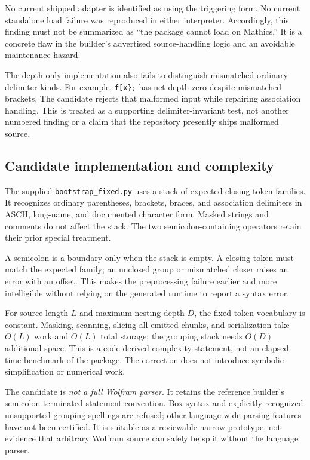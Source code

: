 \documentclass[11pt,letterpaper]{article}
\newcommand{\code}[1]{\nolinkurl{#1}}
\begin{document}
No current shipped adapter is identified as using the triggering form. No current standalone load failure was reproduced in either interpreter. Accordingly, this finding must not be summarized as ``the package cannot load on Mathics.'' It is a concrete flaw in the builder's advertised source-handling logic and an avoidable maintenance hazard.

The depth-only implementation also fails to distinguish mismatched ordinary delimiter kinds. For example, \texttt{f[x\};} has net depth zero despite mismatched brackets. The candidate rejects that malformed input while repairing association handling. This is treated as a supporting delimiter-invariant test, not another numbered finding or a claim that the repository presently ships malformed source.

\subsection{Candidate implementation and complexity}
The supplied \code{bootstrap_fixed.py} uses a stack of expected closing-token families. It recognizes ordinary parentheses, brackets, braces, and association delimiters in ASCII, long-name, and documented character form. Masked strings and comments do not affect the stack. The two semicolon-containing operators retain their prior special treatment.

A semicolon is a boundary only when the stack is empty. A closing token must match the expected family; an unclosed group or mismatched closer raises an error with an offset. This makes the preprocessing failure earlier and more intelligible without relying on the generated runtime to report a syntax error.

For source length \(L\) and maximum nesting depth \(D\), the fixed token vocabulary is constant. Masking, scanning, slicing all emitted chunks, and serialization take \(O(L)\) work and \(O(L)\) total storage; the grouping stack needs \(O(D)\) additional space. This is a code-derived complexity statement, not an elapsed-time benchmark of the package. The correction does not introduce symbolic simplification or numerical work.

The candidate is \emph{not a full Wolfram parser}. It retains the reference builder's semicolon-terminated statement convention. Box syntax and explicitly recognized unsupported grouping spellings are refused; other language-wide parsing features have not been certified. It is suitable as a reviewable narrow prototype, not evidence that arbitrary Wolfram source can safely be split without the language parser.
\end{document}
